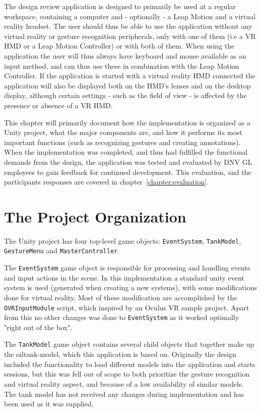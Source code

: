The design review application is designed to primarily be used at a regular workspace, containing a computer and - optionally - a Leap Motion and a virtual reality headset.
The user should thus be able to use the application without any virtual reality or gesture recognition peripherals, only with one of them (i.e a VR HMD or a Leap Motion Controller) 
or with both of them. When using the application the user will thus always have keyboard and mouse available as an input method, 
and can thus use these in combination with the Leap Motion Controller. If the application is started with a virtual reality HMD connected the application will also be displayed
both on the HMD's lenses and on the desktop display, although certain settings - such as the field of view - is affected by the presence or absence of a VR HMD. 

This chapter will primarily document how the implementation is organized as a Unity project, what the major components are, and how it performs its most important functions
(such as recognizing gestures and creating annotations). When the implementation was completed, and thus had fulfilled the functional demands from the design, 
the application was tested and evaluated by DNV GL employees to gain feedback for continued development. This evaluation, and the participants responses are 
covered in chapter~\ref{chapter:evaluation}.

\section{The Project Organization}
The Unity project has four top-level game objects: \texttt{EventSystem}, \texttt{TankModel}, \texttt{GestureMenu} and \texttt{MasterController}. 

The \texttt{EventSystem} game object is responsible for processing and handling events and input actions in the scene. 
In this implementation a standard unity event system is used (generated when creating a new systems), with some modifications done for virtual reality.
Most of these modification are accomplished by the \texttt{OVRInputModule} script, which inspired by an Oculus VR sample project. 
Apart from this no other changes was done to \texttt{EventSystem} as it worked optimally "right out of the box".

The \texttt{TankModel} game object contains several child objects that together make up the oiltank-model, which this application is based on.
Originally the design included the functionality to load different models into the application and starts sessions, but 
this was fell out of scope to both prioritize the gesture recognition and virtual reality aspect, and because of a low availability of similar models.
The tank model has not received any changes during implementation and has been used as it was supplied. 

